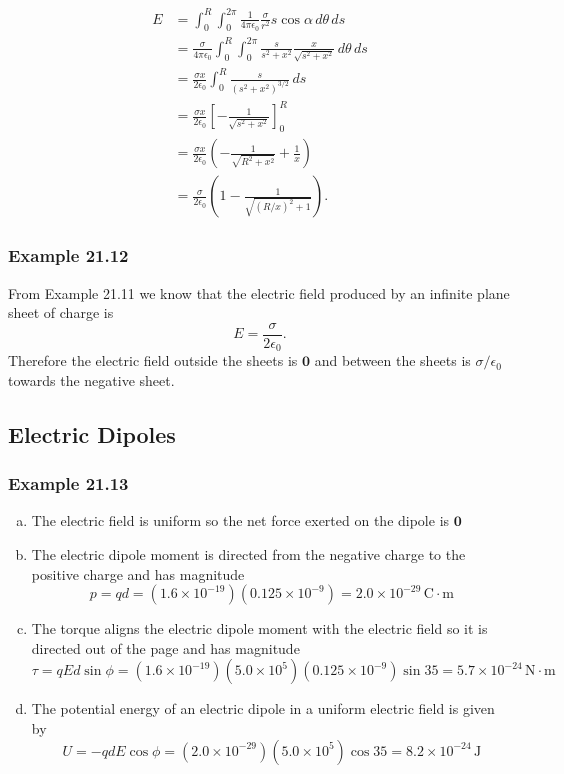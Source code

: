 \documentclass{article}
\begin{document}
\begin{align*}
  E & = \int_0^R \int_0^{2\pi} \frac{1}{4\pi\epsilon_0} \frac{\sigma}{r^2} s \cos\alpha\,d\theta\,ds                       \\
    & = \frac{\sigma}{4\pi\epsilon_0} \int_0^R \int_0^{2\pi} \frac{s}{s^2 + x^2} \frac{x}{\sqrt{s^2 + x^2}} \,d\theta \,ds \\
    & = \frac{\sigma x}{2\epsilon_0} \int_0^R \frac{s}{(s^2 + x^2)^{3/2}} \,ds                                             \\
    & = \frac{\sigma x}{2\epsilon_0} \left[-\frac{1}{\sqrt{s^2 + x^2}}\right]_0^R                                          \\
    & = \frac{\sigma x}{2\epsilon_0} \left(-\frac{1}{\sqrt{R^2 + x^2}} + \frac{1}{x}\right)                                \\
    & = \frac{\sigma}{2\epsilon_0} \left(1 - \frac{1}{\sqrt{(R/x)^2 + 1}}\right).
\end{align*}

\subsubsection{Example 21.12}

From Example 21.11 we know that the electric field produced by an infinite plane sheet of charge is \[E= \frac{\sigma}{2\epsilon_0}.\] Therefore the electric field outside the sheets is $\mathbf{0}$ and between the sheets is $\sigma/\epsilon_0$ towards the negative sheet.

\setcounter{subsection}{6}
\subsection{Electric Dipoles}

\subsubsection{Example 21.13}

\begin{enumerate}[a)]
  \item The electric field is uniform so the net force exerted on the dipole is $\mathbf{0}$

  \item The electric dipole moment is directed from the negative charge to the positive charge and has magnitude \[p = qd = (1.6 \times 10^{-19})(0.125 \times 10^{-9}) = 2.0 \times 10^{-29}\,\textrm{C}\cdot\textrm{m}\]

  \item The torque aligns the electric dipole moment with the electric field so it is directed out of the page and has magnitude \[\tau = qEd\sin\phi = (1.6 \times 10^{-19})(5.0 \times 10^5)(0.125 \times 10^{-9})\sin 35 = 5.7 \times 10^{-24}\,\textrm{N}\cdot\textrm{m}\]

  \item The potential energy of an electric dipole in a uniform electric field is given by \[U = -qdE\cos\phi = (2.0 \times 10^{-29})(5.0 \times 10^5)\cos 35 = 8.2 \times 10^{-24}\,\textrm{J}\]
\end{enumerate}
\end{document}
